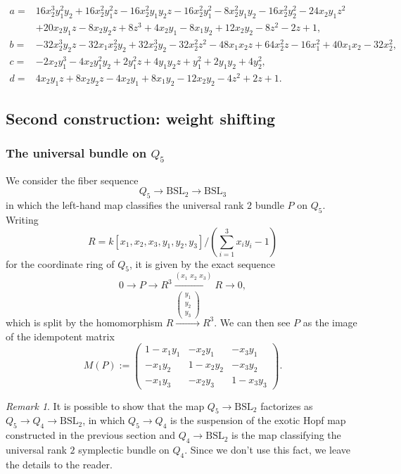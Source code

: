 \documentclass[11pt,leqno]{article}
\renewcommand{\1}{{\rm 1\hspace*{-0.4ex}%
\rule{0.1ex}{1.52ex}\hspace*{0.2ex}}}
\newcommand{\<}[1]{{\langle}#1 {\rangle}}
\theoremstyle{plain}
\theoremstyle{definition}
\theoremstyle{remark}
\newtheorem{rem}[thm]{Remark}
\numberwithin{equation}{section}
\begin{document}
\begin{align*}
    a =& 16x_2^3y_1^2y_2+16x_2^2y_1^2z-16x_2^2y_1y_2z-16x_2^2y_1^2-8x_2^2y_1y_2-16x_2^2y_2^2-24x_2y_1z^2 \\&+20x_2y_1z-8x_2y_2z+8z^3+4x_2y_1-8x_1y_2+12x_2y_2-8z^2-2z+1, \\
    b =& -32x_2^3y_2z-32x_1x_2^2y_2+32x_2^3y_2-32x_2^2z^2-48x_1x_2z+64x_2^2z-16x_1^2+40x_1x_2-32x_2^2, \\
    c =& -2x_2y_1^3-4x_2y_1^2y_2+2y_1^2z+4y_1y_2z+y_1^2+2y_1y_2+4y_2^2, \\
    d =& 4x_2y_1z+8x_2y_2z-4x_2y_1+8x_1y_2-12x_2y_2-4z^2+2z+1.
\end{align*}

\subsection{Second construction: weight shifting}


\subsubsection{The universal bundle on $Q_5$}
We consider the fiber sequence
\[
Q_5\to \mathrm{BSL}_2\to \mathrm{BSL}_3 
\]
in which the left-hand map classifies the universal rank $2$ bundle $P$ on $Q_5$. Writing 
\[
R=k[x_1,x_2,x_3,y_1,y_2,y_3]/(\sum_{i=1}^3 x_iy_i-1)
\]
for the coordinate ring of $Q_5$, it is given by the exact sequence
\[
0\to P\to R^3\xrightarrow{(x_1\phantom{i}x_2\phantom{i}x_3)} R\to 0,
\]
which is split by the homomorphism $R\xrightarrow{\begin{pmatrix} y_1 \\ y_2 \\y_3\end{pmatrix}}R^3$. We can then see $P$ as the image of the idempotent matrix
\begin{equation}\label{eqn:universalidempotent}
M(P):=\begin{pmatrix} 1-x_1y_1 & -x_2y_1 & -x_3y_1 \\ -x_1y_2 & 1-x_2y_2 & -x_3y_2 \\ -x_1y_3 & -x_2y_3 & 1-x_3y_3\end{pmatrix}.
\end{equation}
\begin{rem}
It is possible to show that the map $Q_5\to \mathrm{BSL}_2$ factorizes as $Q_5\to Q_4\to \mathrm{BSL}_2$, in which $Q_5\to Q_4$ is the suspension of the exotic Hopf map constructed in the previous section and $Q_4\to \mathrm{BSL}_2$ is the map classifying the universal rank $2$ symplectic bundle on $Q_4$. Since we don't use this fact, we leave the details to the reader.
\end{rem}
\end{document}

